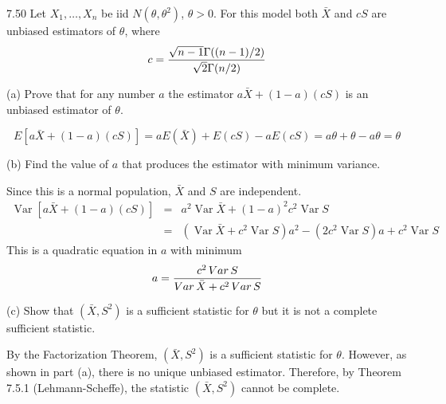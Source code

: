 \documentclass[12pt]{article}
\begin{document}
7.50
Let $X_1,\ldots,X_n$ be iid $N(\theta,\theta^2)$, $\theta>0$.
For this model both $\bar X$ and $cS$ are unbiased estimators
of $\theta$, where
$$c={\sqrt{n-1}\Gamma((n-1)/2)\over\sqrt2\Gamma(n/2)}$$

\bigskip
\noindent
(a) Prove that for any number $a$ the estimator
$a\bar X+(1-a)(cS)$ is an unbiased estimator of $\theta$.

\bigskip
\noindent
$$E[a\bar X+(1-a)(cS)]=aE(\bar X)+E(cS)-aE(cS)
=a\theta+\theta-a\theta=\theta$$

\bigskip
\noindent
(b) Find the value of $a$ that produces the estimator with
minimum variance.

\bigskip
\noindent
Since this is a normal population, $\bar X$ and $S$ are independent.
\begin{eqnarray*}
\mathop{Var}[a\bar X+(1-a)(cS)]&=&
a^2\mathop{Var}\bar X+(1-a)^2c^2\mathop{Var}S\\
&=&(\mathop{Var}\bar X+c^2\mathop{Var}S)a^2-(2c^2\mathop{Var}S)a
+c^2\mathop{Var}S
\end{eqnarray*}
This is a quadratic equation in $a$ with minimum
$$a={c^2\mathop{Var}S\over\mathop{Var}\bar X+c^2\mathop{Var}S}$$

\bigskip
\noindent
(c) Show that $(\bar X,S^2)$ is a sufficient statistic for $\theta$
but it is not a complete sufficient statistic.

\bigskip
\noindent
By the Factorization Theorem, $(\bar X,S^2)$
is a sufficient statistic for $\theta$.
However, as shown in part (a), there is no unique unbiased estimator.
Therefore, by Theorem 7.5.1 (Lehmann-Scheffe), the statistic
$(\bar X,S^2)$ cannot be complete.
\end{document}
